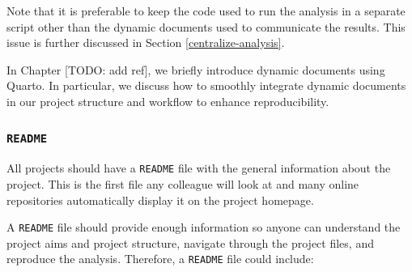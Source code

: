 \documentclass[
  11pt,
]{book}
\begin{document}
Note that it is preferable to keep the code used to run the analysis in a separate script other than the dynamic documents used to communicate the results. This issue is further discussed in Section \ref{centralize-analysis}.

In Chapter {[}TODO: add ref{]}, we briefly introduce dynamic documents using Quarto. In particular, we discuss how to smoothly integrate dynamic documents in our project structure and workflow to enhance reproducibility.

\hypertarget{readme}{%
\subsubsection{\texorpdfstring{\texttt{README}}{README}}\label{readme}}

All projects should have a \texttt{README} file with the general information about the project. This is the first file any colleague will look at and many online repositories automatically display it on the project homepage.

A \texttt{README} file should provide enough information so anyone can understand the project aims and project structure, navigate through the project files, and reproduce the analysis. Therefore, a \texttt{README} file could include:
\end{document}
